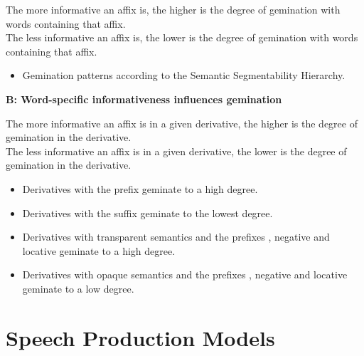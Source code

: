 {\noindent		The more informative an affix is, the higher is the degree of gemination with words containing that affix. \\
		
\noindent	The less informative an affix is, the lower is the degree of gemination with words 
		containing that affix. 
	
				\begin{itemize}
	\item	Gemination patterns according to the Semantic Segmentability Hierarchy. 		\\
		

\end{itemize}


	
\noindent	\textbf{B: \hspace{0.5cm} Word-specific informativeness influences gemination}\vspace{0.2 cm}
	
\noindent	The more informative an affix is in a given derivative, the higher is the degree of gemination in the derivative.\\ 


	
\noindent	The less informative an affix is in a given derivative, the lower is the degree of gemination in the derivative.%
	
			\begin{itemize}
				
				\item Derivatives with the prefix  geminate to a high degree.		
				\item Derivatives with the suffix  geminate to the lowest degree.
				\item  Derivatives with transparent semantics and the prefixes , negative  and locative  geminate to a high degree.	
				\item  Derivatives with opaque semantics and the prefixes , negative  and locative  geminate to a low degree.	\\
			\end{itemize}	



 
\section{Speech Production Models}\label{speech production models}

}
